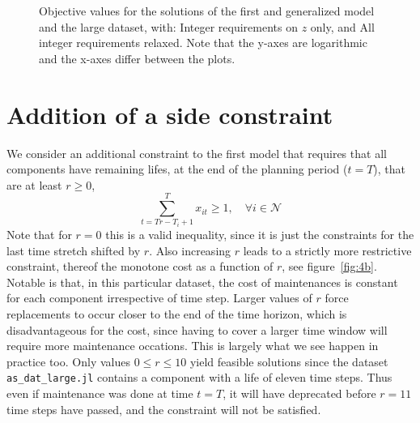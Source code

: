 \documentclass{article}
\begin{document}
\begin{figure}
    \centering
    \caption{Objective values for the solutions of the first and generalized model
    and the large dataset, with:
    \protect{} Integer requirements on $z$ only, and
    \protect{} All integer requirements relaxed.
    Note that the y-axes are logarithmic and the x-axes differ between the plots. \label{fig:3_obj}}
\end{figure}

\section{Addition of a side constraint}
We consider an additional constraint to the first model
that requires that all components have remaining lifes,
at the end of the planning period ($t=T$),
that are at least $r \ge 0$,
\begin{equation}\tag{MinRemLife}
\sum_{t = T r - T_i + 1}^T x_{it} \ge 1, \quad \forall i \in \mathcal N
\end{equation}
Note that for $r=0$ this is a valid inequality,
since it is just the constraints for the last time stretch shifted by $r$.
Also increasing $r$ leads to a strictly more restrictive constraint,
thereof the monotone cost as a function of $r$,
see figure~\ref{fig:4b}.
Notable is that, in this particular dataset,
the cost of maintenances is constant for each component
irrespective of time step.
Larger values of $r$ force replacements to occur closer
to the end of the time horizon,
which is disadvantageous for the cost,
since having to cover a larger time window will require more maintenance occations.
This is largely what we see happen in practice too.
Only values $0 \le r \le 10$ yield feasible solutions since
the dataset \verb+as_dat_large.jl+ contains a component with a life
of eleven time steps.
Thus even if maintenance was done at time $t = T$,
it will have deprecated before $r=11$ time steps have passed,
and the constraint will not be satisfied.
\end{document}
